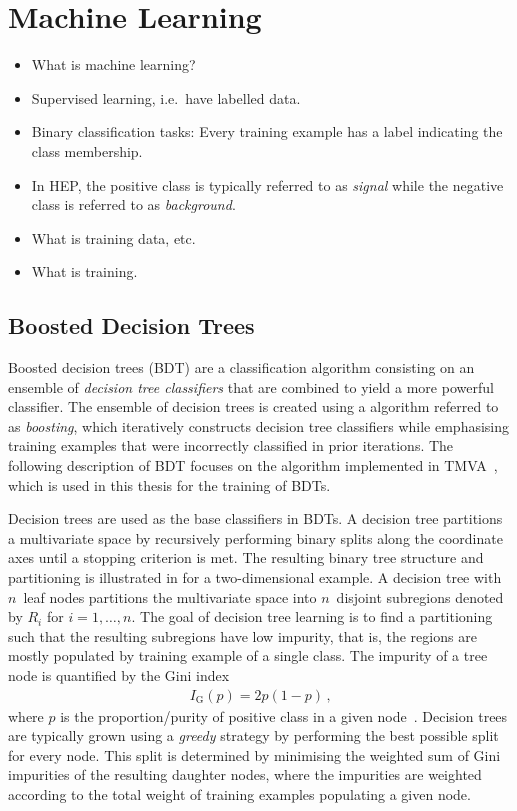 \section{Machine Learning}

\begin{itemize}
\item What is machine learning?
\item Supervised learning, i.e.\ have labelled data.
\item Binary classification tasks: Every training example has a label indicating
  the class membership.
\item In HEP, the positive class is typically referred to as \emph{signal} while
  the negative class is referred to as \emph{background}.
\item What is training data, etc.
\item What is training.
\end{itemize}


\subsection{Boosted Decision Trees}

Boosted decision trees (BDT) are a classification algorithm consisting on an
ensemble of \emph{decision tree classifiers} that are combined to yield a more
powerful classifier. The ensemble of decision trees is created using a algorithm
referred to as \emph{boosting}, which iteratively constructs decision tree
classifiers while emphasising training examples that were incorrectly classified
in prior iterations. The following description of BDT focuses on the algorithm
implemented in \textsc{TMVA}~\cite{TMVA}, which is used in this thesis for the
training of BDTs.

Decision trees are used as the base classifiers in BDTs. A decision tree
partitions a multivariate space by recursively performing binary splits along
the coordinate axes until a stopping criterion is met. The resulting binary tree
structure and partitioning is illustrated in  for a
two-dimensional example. A decision tree with $n$~leaf nodes partitions the
multivariate space into $n$~disjoint subregions denoted by $R_i$ for
$i = 1, \dots, n$. The goal of decision tree learning is to find a partitioning
such that the resulting subregions have low impurity, that is, the regions are
mostly populated by training example of a single class. The impurity of a tree
node is quantified by the Gini index
\begin{align*}
  I_{\text{G}}(p) = 2 p (1 - p) \,\text{,}
\end{align*}
where $p$ is the proportion/purity of positive class in a given
node~\cite{hastie09}. Decision trees are typically grown using a \emph{greedy}
strategy by performing the best possible split for every node. This split is
determined by minimising the weighted sum of Gini impurities of the resulting
daughter nodes, where the impurities are weighted according to the total weight
of training examples populating a given node.


